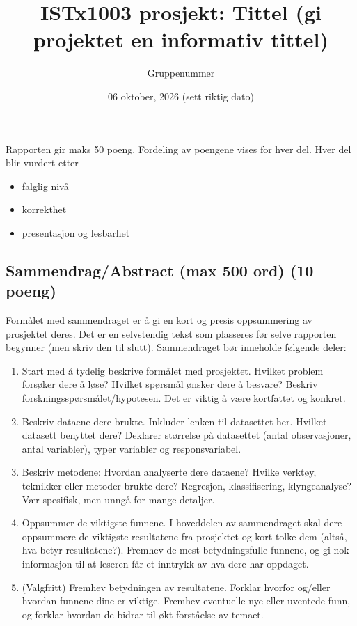 \documentclass[]{article}
\title{ISTx1003 prosjekt: Tittel (gi projektet en informativ tittel)}
\author{Gruppenummer}
\date{06 oktober, 2026 (sett riktig dato)}
\providecommand{\tightlist}{%
  \setlength{\itemsep}{0pt}\setlength{\parskip}{0pt}}
\begin{document}
\maketitle

Rapporten gir maks 50 poeng. Fordeling av poengene vises for hver del.
Hver del blir vurdert etter

\begin{itemize}
\tightlist
\item
  falglig nivå
\item
  korrekthet
\item
  presentasjon og lesbarhet
\end{itemize}

\subsection{Sammendrag/Abstract (max 500 ord) (10
poeng)}\label{sammendragabstract-max-500-ord-10-poeng}

Formålet med sammendraget er å gi en kort og presis oppsummering av
prosjektet deres. Det er en selvstendig tekst som plasseres før selve
rapporten begynner (men skriv den til slutt). Sammendraget bør inneholde
følgende deler:

\begin{enumerate}
\def\labelenumi{\arabic{enumi}.}
\tightlist
\item
  Start med å tydelig beskrive formålet med prosjektet. Hvilket problem
  forsøker dere å løse? Hvilket spørsmål ønsker dere å besvare? Beskriv
  forskningsspørsmålet/hypotesen. Det er viktig å være kortfattet og
  konkret.
\item
  Beskriv dataene dere brukte. Inkluder lenken til datasettet her.
  Hvilket datasett benyttet dere? Deklarer størrelse på datasettet
  (antal observasjoner, antal variabler), typer variabler og
  responsvariabel.
\item
  Beskriv metodene: Hvordan analyserte dere dataene? Hvilke verktøy,
  teknikker eller metoder brukte dere? Regresjon, klassifisering,
  klyngeanalyse? Vær spesifisk, men unngå for mange detaljer.
\item
  Oppsummer de viktigste funnene. I hoveddelen av sammendraget skal dere
  oppsummere de viktigste resultatene fra prosjektet og kort tolke dem
  (altså, hva betyr resultatene?). Fremhev de mest betydningsfulle
  funnene, og gi nok informasjon til at leseren får et inntrykk av hva
  dere har oppdaget.
\item
  (Valgfritt) Fremhev betydningen av resultatene. Forklar hvorfor
  og/eller hvordan funnene dine er viktige. Fremhev eventuelle nye eller
  uventede funn, og forklar hvordan de bidrar til økt forståelse av
  temaet.
\end{enumerate}
\end{document}

